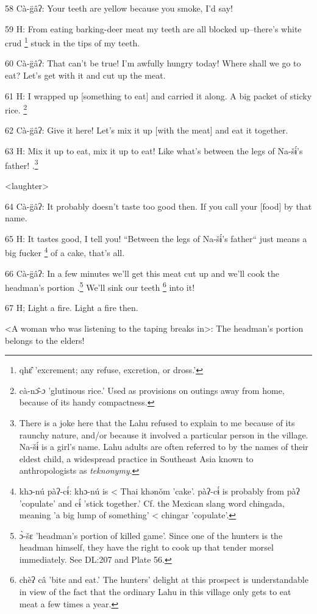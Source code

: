 58  Cà-g̈âʔ: Your teeth are yellow because you smoke, I'd say!

59 H: From eating barking-deer meat my teeth are all blocked up--there's white
crud \footnote{qhɛ̂ 'excrement; any refuse, excretion, or dross.'} stuck in the tips of my teeth.

60  Cà-g̈âʔ: That can't be true! I'm awfully hungry today! Where shall we go
to eat? Let's get with it and cut up the meat.

61 H: I wrapped up [something to eat] and carried it along. A big packet of sticky
rice. \footnote{cà-nɔ̂-\emph{ɔ} 'glutinous rice.' Used as provisions on outings away from home, because of its handy compactness.}

62  Cà-g̈âʔ: Give it here! Let's mix it up [with the meat] and eat it together.

63 H: Mix it up to eat, mix it up to eat! Like what's between the legs of Na-šɨ́'s
father! .\footnote{There is a joke here that the Lahu refused to explain to me because of its raunchy nature, and/or because it involved a particular person in the village. Na-šɨ́ is a girl's name. Lahu adults are often referred to by the names of their eldest child, a widespread practice in Southeast Asia known to anthropologists as \textit{teknonymy}.}

<laughter>

64 Cà-g̈âʔ: It probably doesn't taste too good then. If you call your [food]
by that name.

65 H: It tastes good, I tell you! ``Between the legs of Na-šɨ́'s father``
just means a big fucker \footnote{khɔ-nú pàʔ-cɨ́: khɔ-nú is < Thai khənǒm 'cake'. pàʔ-cɨ́ is probably from pàʔ 'copulate' and cɨ́ 'stick together.' Cf. the Mexican slang word chingada, meaning 'a big lump of something' < chingar 'copulate'.} of a cake, that's all.

66  Cà-g̈âʔ: In a few minutes we'll get this meat cut up and we'll cook the
headman's portion .\footnote{ɔ̀-šɛ 'headman's portion of killed game'. Since one of the hunters is the headman himself, they have the right to cook up that tender morsel immediately. See DL:207 and Plate 56.} We'll sink our teeth \footnote{chèʔ câ 'bite and eat.' The hunters' delight at this prospect is understandable in view of the fact that the ordinary Lahu in this village only gets to eat meat a few times a year.} into it!

67 H; Light a fire. Light a fire then.

<A woman who was listening to the taping breaks in>: The headman's
portion belongs to the elders!

